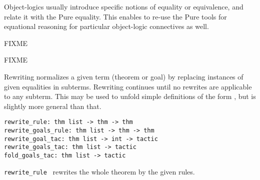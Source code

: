 \begin{isabellebody}
\begin{isamarkuptext}
  Object-logics usually introduce specific notions of equality or
  equivalence, and relate it with the Pure equality.  This enables to
  re-use the Pure tools for equational reasoning for particular
  object-logic connectives as well.%
\end{isamarkuptext}%
\isamarkuptrue%
%
\isamarkuptrue%
%
\begin{isamarkuptext}%
FIXME%
\end{isamarkuptext}%
\isamarkuptrue%
%
\isamarkuptrue%
%
\begin{isamarkuptext}%
FIXME%
\end{isamarkuptext}%
\isamarkuptrue%
%
\isamarkuptrue%
%
\begin{isamarkuptext}%
Rewriting normalizes a given term (theorem or goal) by
  replacing instances of given equalities  in subterms.
  Rewriting continues until no rewrites are applicable to any subterm.
  This may be used to unfold simple definitions of the form , but is slightly more general than that.%
\end{isamarkuptext}%
\isamarkuptrue%
%
\isadelimmlref
%
\endisadelimmlref
%
\isatagmlref
%
\begin{isamarkuptext}%
\begin{mldecls}
  \verb|rewrite_rule: thm list -> thm -> thm| \\
  \verb|rewrite_goals_rule: thm list -> thm -> thm| \\
  \verb|rewrite_goal_tac: thm list -> int -> tactic| \\
  \verb|rewrite_goals_tac: thm list -> tactic| \\
  \verb|fold_goals_tac: thm list -> tactic| \\
  \end{mldecls}

  \begin{description}

  \item \verb|rewrite_rule|~ rewrites the whole
  theorem by the given rules.


\end{description}
\end{isamarkuptext}
\end{isabellebody}
